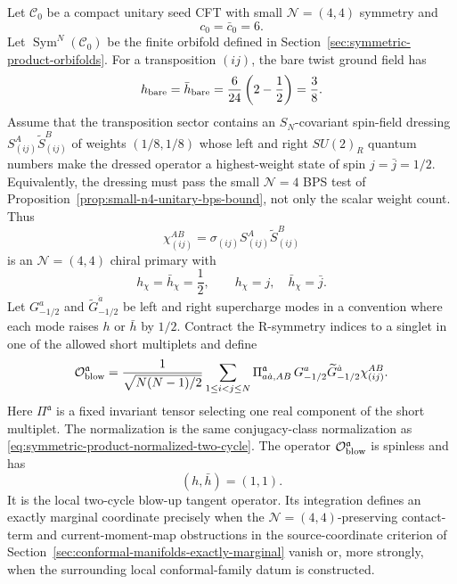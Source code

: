 \begin{construction}[\(\mathcal N=(4,4)\) two-cycle marginal tangent]
\label{constr:n4-symmetric-product-two-cycle-marginal}
Let \(\mathcal C_0\) be a compact unitary seed CFT with small
\(\mathcal N=(4,4)\) symmetry and
\[
  c_0=\bar c_0=6.
\]
Let \(\operatorname{Sym}^N(\mathcal C_0)\) be the finite orbifold defined in
Section~\ref{sec:symmetric-product-orbifolds}.  For a transposition
\((ij)\), the bare twist ground field has
\begin{equation}
  h_{\rm bare}=\bar h_{\rm bare}
  =
  \frac{6}{24}\left(2-\frac12\right)
  =
  \frac38 .
  \label{eq:n4-symprod-bare-two-twist-weight}
\end{equation}
Assume that the transposition sector contains an
\(S_N\)-covariant spin-field dressing \(S_{(ij)}^A\widetilde S_{(ij)}^B\)
of weights \((1/8,1/8)\) whose left and right \(SU(2)_R\) quantum numbers
make the dressed operator a highest-weight state of spin
\(j=\bar j=1/2\).  Equivalently, the dressing must pass the small
\(\mathcal N=4\) BPS test of
Proposition~\ref{prop:small-n4-unitary-bps-bound}, not only the scalar
weight count.  Thus
\begin{equation}
  \chi_{(ij)}^{AB}
  =
  \sigma_{(ij)}S_{(ij)}^A\widetilde S_{(ij)}^B
  \label{eq:n4-symprod-dressed-twist-chiral-primary}
\end{equation}
is an \(\mathcal N=(4,4)\) chiral primary with
\[
  h_\chi=\bar h_\chi=\frac12,
  \qquad
  h_\chi=j,\quad \bar h_\chi=\bar j .
\]
Let \(G_{-1/2}^{a}\) and \(\widetilde G_{-1/2}^{\dot a}\) be left and right
supercharge modes in a convention where each mode raises \(h\) or \(\bar h\)
by \(1/2\).  Contract the R-symmetry indices to a singlet in one of the
allowed short multiplets and define
\begin{equation}
  \mathcal O_{\rm blow}^{\mathfrak a}
  =
  \frac{1}{\sqrt{N(N-1)/2}}
  \sum_{1\le i<j\le N}
  \Pi^{\mathfrak a}_{a\dot a,AB}\,
  G_{-1/2}^{a}\widetilde G_{-1/2}^{\dot a}
  \chi_{(ij)}^{AB}.
  \label{eq:n4-symprod-blowup-marginal-operator}
\end{equation}
Here \(\Pi^{\mathfrak a}\) is a fixed invariant tensor selecting one real
component of the short multiplet.  The normalization is the same
conjugacy-class normalization as
\eqref{eq:symmetric-product-normalized-two-cycle}.  The operator
\(\mathcal O_{\rm blow}^{\mathfrak a}\) is spinless and has
\[
  (h,\bar h)=(1,1).
\]
It is the local two-cycle blow-up tangent operator.  Its integration defines
an exactly marginal coordinate precisely when the
\(\mathcal N=(4,4)\)-preserving contact-term and current-moment-map
obstructions in the source-coordinate criterion of
Section~\ref{sec:conformal-manifolds-exactly-marginal} vanish or, more
strongly, when the surrounding local conformal-family datum is constructed.
\end{construction}

